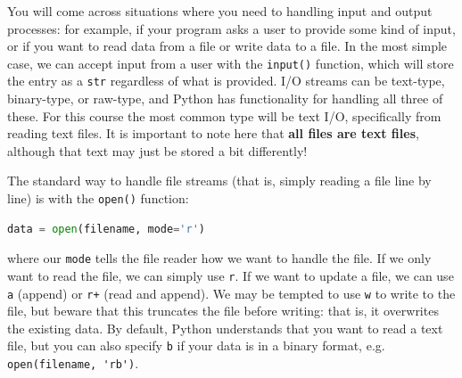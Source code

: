 \documentclass{tufte-book}
\begin{document}



You will come across situations where you need to handling input and output processes: for example, if your program asks a user to provide some kind of input, or if you want to read data from a file or write data to a file. In the most simple case, we can accept input from a user with the \verb|input()| function, which will store the entry as a \verb|str| regardless of what is provided. I/O streams can be text-type, binary-type, or raw-type, and Python has functionality for handling all three of these. For this course the most common type will be text I/O, specifically from reading text files. It is important to note here that \textbf{all files are text files}, although that text may just be stored a bit differently!

The standard way to handle file streams (that is, simply reading a file line by line) is with the \verb|open()| function:

\begin{lstlisting}[language=Python, showstringspaces=false, backgroundcolor=\color{lightgray}]
data = open(filename, mode='r')
\end{lstlisting}

\noindent where our \verb|mode| tells the file reader how we want to handle the file. If we only want to read the file, we can simply use \verb|r|. If we want to update a file, we can use \verb|a| (append) or \verb|r+| (read and append). We may be tempted to use \verb|w| to write to the file, but beware that this truncates the file before writing: that is, it overwrites the existing data. By default, Python understands that you want to read a text file, but you can also specify \verb|b| if your data is in a binary format, e.g. \verb|open(filename, 'rb')|.
\end{document}
